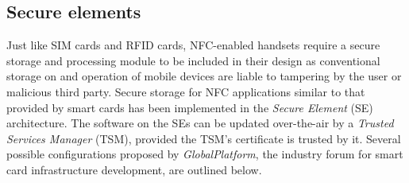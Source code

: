 


\subsection{Secure elements}
Just like SIM cards and RFID cards, NFC-enabled handsets require a secure storage and processing module to be included in their design as conventional storage on and operation of mobile devices are liable to tampering by the user or malicious third party.
Secure storage for NFC applications similar to that provided by smart cards has been implemented in the \textit{Secure Element} (SE) architecture.
The software on the SEs can be updated over-the-air by a \textit{Trusted Services Manager} (TSM), provided the TSM's certificate is trusted by it.
Several possible configurations proposed by \textit{GlobalPlatform}, the industry forum for smart card infrastructure development, are outlined below. \cite{Reveilhac:2009:PSE:1548884.1549404,GlobalPlatformSEs}





